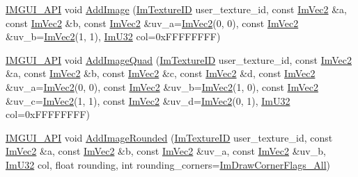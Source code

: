 \begin{DoxyCompactItemize}
\item 
\mbox{\hyperlink{imgui_8h_a43829975e84e45d1149597467a14bbf5}{I\+M\+G\+U\+I\+\_\+\+A\+PI}} void \mbox{\hyperlink{struct_im_draw_list_ac37cd998bf5f40705c7445004a029b66}{Add\+Image}} (\mbox{\hyperlink{imgui_8h_a364f4447ecbc4ca176145ccff9db6286}{Im\+Texture\+ID}} user\+\_\+texture\+\_\+id, const \mbox{\hyperlink{struct_im_vec2}{Im\+Vec2}} \&a, const \mbox{\hyperlink{struct_im_vec2}{Im\+Vec2}} \&b, const \mbox{\hyperlink{struct_im_vec2}{Im\+Vec2}} \&uv\+\_\+a=\mbox{\hyperlink{struct_im_vec2}{Im\+Vec2}}(0, 0), const \mbox{\hyperlink{struct_im_vec2}{Im\+Vec2}} \&uv\+\_\+b=\mbox{\hyperlink{struct_im_vec2}{Im\+Vec2}}(1, 1), \mbox{\hyperlink{imgui_8h_a118cff4eeb8d00e7d07ce3d6460eed36}{Im\+U32}} col=0x\+F\+F\+F\+F\+F\+F\+F\+F)
\item 
\mbox{\hyperlink{imgui_8h_a43829975e84e45d1149597467a14bbf5}{I\+M\+G\+U\+I\+\_\+\+A\+PI}} void \mbox{\hyperlink{struct_im_draw_list_a1cc1f8d4d1812c65c7887b8d5aef31fe}{Add\+Image\+Quad}} (\mbox{\hyperlink{imgui_8h_a364f4447ecbc4ca176145ccff9db6286}{Im\+Texture\+ID}} user\+\_\+texture\+\_\+id, const \mbox{\hyperlink{struct_im_vec2}{Im\+Vec2}} \&a, const \mbox{\hyperlink{struct_im_vec2}{Im\+Vec2}} \&b, const \mbox{\hyperlink{struct_im_vec2}{Im\+Vec2}} \&c, const \mbox{\hyperlink{struct_im_vec2}{Im\+Vec2}} \&d, const \mbox{\hyperlink{struct_im_vec2}{Im\+Vec2}} \&uv\+\_\+a=\mbox{\hyperlink{struct_im_vec2}{Im\+Vec2}}(0, 0), const \mbox{\hyperlink{struct_im_vec2}{Im\+Vec2}} \&uv\+\_\+b=\mbox{\hyperlink{struct_im_vec2}{Im\+Vec2}}(1, 0), const \mbox{\hyperlink{struct_im_vec2}{Im\+Vec2}} \&uv\+\_\+c=\mbox{\hyperlink{struct_im_vec2}{Im\+Vec2}}(1, 1), const \mbox{\hyperlink{struct_im_vec2}{Im\+Vec2}} \&uv\+\_\+d=\mbox{\hyperlink{struct_im_vec2}{Im\+Vec2}}(0, 1), \mbox{\hyperlink{imgui_8h_a118cff4eeb8d00e7d07ce3d6460eed36}{Im\+U32}} col=0x\+F\+F\+F\+F\+F\+F\+F\+F)
\item 
\mbox{\hyperlink{imgui_8h_a43829975e84e45d1149597467a14bbf5}{I\+M\+G\+U\+I\+\_\+\+A\+PI}} void \mbox{\hyperlink{struct_im_draw_list_a1418616a4350bad80b4c751cd8efac30}{Add\+Image\+Rounded}} (\mbox{\hyperlink{imgui_8h_a364f4447ecbc4ca176145ccff9db6286}{Im\+Texture\+ID}} user\+\_\+texture\+\_\+id, const \mbox{\hyperlink{struct_im_vec2}{Im\+Vec2}} \&a, const \mbox{\hyperlink{struct_im_vec2}{Im\+Vec2}} \&b, const \mbox{\hyperlink{struct_im_vec2}{Im\+Vec2}} \&uv\+\_\+a, const \mbox{\hyperlink{struct_im_vec2}{Im\+Vec2}} \&uv\+\_\+b, \mbox{\hyperlink{imgui_8h_a118cff4eeb8d00e7d07ce3d6460eed36}{Im\+U32}} col, float rounding, int rounding\+\_\+corners=\mbox{\hyperlink{imgui_8h_ad3b7317312a7b22064ff6b6d00a54258a4e075323857172f48c44c3953f5b03df}{Im\+Draw\+Corner\+Flags\+\_\+\+All}})

\end{DoxyCompactItemize}
